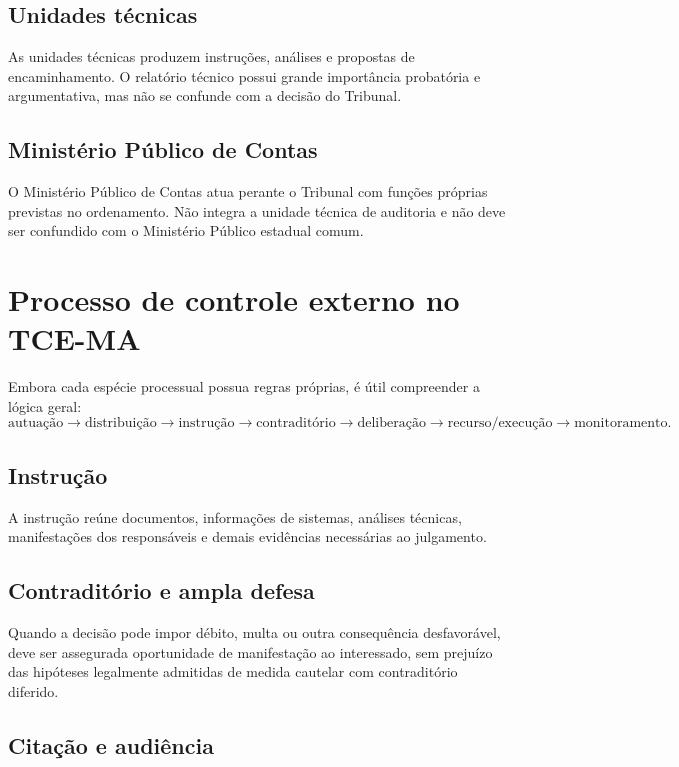 \subsection{Unidades técnicas}

As unidades técnicas produzem instruções, análises e propostas de encaminhamento. O relatório técnico possui grande importância probatória e argumentativa, mas não se confunde com a decisão do Tribunal.

\subsection{Ministério Público de Contas}

O Ministério Público de Contas atua perante o Tribunal com funções próprias previstas no ordenamento. Não integra a unidade técnica de auditoria e não deve ser confundido com o Ministério Público estadual comum.

\section{Processo de controle externo no TCE-MA}

Embora cada espécie processual possua regras próprias, é útil compreender a lógica geral:
\[
\text{autuação}\rightarrow
\text{distribuição}\rightarrow
\text{instrução}\rightarrow
\text{contraditório}\rightarrow
\text{deliberação}\rightarrow
\text{recurso/execução}\rightarrow
\text{monitoramento}.
\]

\subsection{Instrução}

A instrução reúne documentos, informações de sistemas, análises técnicas, manifestações dos responsáveis e demais evidências necessárias ao julgamento.

\subsection{Contraditório e ampla defesa}

Quando a decisão pode impor débito, multa ou outra consequência desfavorável, deve ser assegurada oportunidade de manifestação ao interessado, sem prejuízo das hipóteses legalmente admitidas de medida cautelar com contraditório diferido.

\subsection{Citação e audiência}

